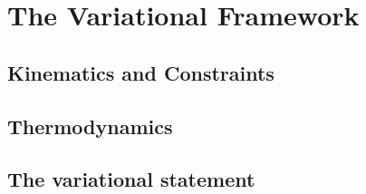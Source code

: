 \section{The Variational Framework}

\sectioncover

\subsection{Kinematics and Constraints}

\begin{frame}
\end{frame}

\subsection{Thermodynamics}

\begin{frame}
\end{frame}

\subsection{The variational statement}

\begin{frame}
\end{frame}
